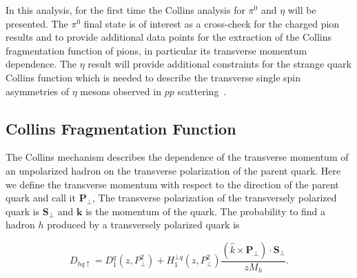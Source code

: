  In this analysis, for the first time the Collins analysis for $\pi^{0}$ and $\eta$ will be presented. The $\pi^0$ final state is of interest as a cross-check for the charged pion results and to provide additional data points for the extraction of the Collins fragmentation function of pions, in particular its transverse momentum dependence. The $\eta$ result will provide additional constraints for the strange quark Collins function which is needed to describe the transverse single spin asymmetries of $\eta$ mesons observed in $pp$ scattering~\cite{StarTSSA2}\cite{PHENIX}. 


\subsection{Collins Fragmentation Function}
The Collins mechanism describes the dependence of the transverse momentum of an unpolarized hadron on the transverse polarization of the parent quark. Here we define the transverse momentum with respect to the direction of the parent quark and call it $\boldsymbol{P}_{\bot}$, The transverse polarization of the transversely polarized quark is $\boldsymbol{S}_\perp$ and $\boldsymbol{k}$ is the momentum of the quark. The probability to find a hadron $h$ produced by a transversely polarized quark is~\cite{ChargedPionResult,SSATrentoConvention}

\begin{equation}
D_{hq\uparrow}=D^q_1(z,P^2_{\bot})+H^{\bot q}_1(z,P^2_{\bot})\frac{(\hat{k}\times \boldsymbol{P}_{\bot})\cdot \boldsymbol{S}_{\perp}}{zM_h}.
\label{eqn:FF1}
\end{equation}




